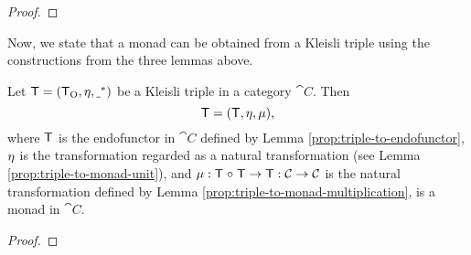 \begin{proposition}
\begin{proof}
  \end{proof}

\end{proposition}

Now, we state that a monad can be obtained from a Kleisli triple using
the constructions from the three lemmas above.

\begin{lemma}
  \label{lem:triple-to-monad}

  Let $\mathsf{T} = (\mathsf{T}_{\operatorname{O}}, \eta, \underline{~}^*)$ be a
  Kleisli triple in a category $\cat{C}$. Then
  \begin{equation*}
    \mathsf{T} = (\mathsf{T}, \eta, \mu)
    \text{,}
  \end{equation*}
  where $\mathsf{T}$ is the endofunctor in $\cat{C}$ defined by Lemma
  \ref{prop:triple-to-endofunctor}, $\eta$ is the transformation
  \nat{\eta} regarded as a natural transformation (see Lemma
  \ref{prop:triple-to-monad-unit}), and $\mu: \mathsf{T} \mathrel{\circ}
  \mathsf{T} \to \mathsf{T}: \mathcal{C} \to \mathcal{C}$ is the natural
  transformation defined by Lemma
  \ref{prop:triple-to-monad-multiplication}, is a monad in $\cat{C}$.

  \begin{proof}


\end{proof}
\end{lemma}

